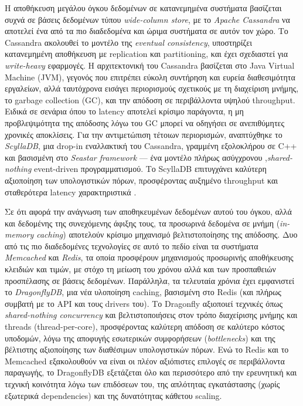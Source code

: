 Η αποθήκευση μεγάλου όγκου δεδομένων σε κατανεμημένα συστήματα βασίζεται συχνά σε βάσεις δεδομένων τύπου \textit{wide-column store}, με το \textit{Apache Cassandra} να αποτελεί ένα από τα πιο διαδεδομένα και ώριμα συστήματα σε αυτόν τον χώρο. Το Cassandra ακολουθεί το μοντέλο της \textit{eventual consistency}, υποστηρίζει κατανεμημένη αποθήκευση με replication και partitioning, και έχει σχεδιαστεί για \textit{write-heavy} εφαρμογές. Η αρχιτεκτονική του Cassandra βασίζεται στο Java Virtual Machine (JVM), γεγονός που επιτρέπει εύκολη συντήρηση και ευρεία διαθεσιμότητα εργαλείων, αλλά ταυτόχρονα εισάγει περιορισμούς σχετικούς με τη διαχείριση μνήμης, το garbage collection (GC), και την απόδοση σε περιβάλλοντα υψηλού throughput. Ειδικά σε σενάρια όπου το latency αποτελεί κρίσιμο παράγοντα, η μη προβλεψιμότητα της απόδοσης λόγω του GC μπορεί να οδηγήσει σε ανεπιθύμητες χρονικές αποκλίσεις. Για την αντιμετώπιση τέτοιων περιορισμών, αναπτύχθηκε το \textit{ScyllaDB}, μια drop-in εναλλακτική του Cassandra, γραμμένη εξολοκλήρου σε C++ και βασισμένη στο \textit{Seastar framework} — ένα μοντέλο πλήρως ασύγχρονου ,\textit{shared-nothing} event-driven προγραμματισμού. Το ScyllaDB επιτυγχάνει καλύτερη αξιοποίηση των υπολογιστικών πόρων, προσφέροντας αυξημένο throughput και σταθερότερα latency χαρακτηριστικά \cite{scyllainaction}.

Σε ότι αφορά την ανάγνωση των αποθηκευμένων δεδομένων αυτού του όγκου, αλλά και δεδομένης της συνεχόμενης άφιξης τους, τα προσωρινά δεδομένα σε μνήμη (\textit{in-memory caching}) αποτελούν κρίσιμο μηχανισμό βελτιστοποίησης της απόδοσης. Δυο από τις πιο διαδεδομένες τεχνολογίες σε αυτό το πεδίο είναι τα συστήματα \textit{Memcached} και \textit{Redis}, τα οποία προσφέρουν μηχανισμούς προσωρινής αποθήκευσης κλειδιών και τιμών, με στόχο τη μείωση του χρόνου αλλά και των προσπαθειών προσπέλασης σε βάσεις δεδομένων. Παράλληλα, τα τελευταία χρόνια έχει εμφανιστεί το \textit{DragonflyDB}, μια νέα υλοποίηση caching, βασισμένη στο Redis (και πλήρως συμβατή με το API και τους drivers του). Το Dragonfly αξιοποιεί τεχνικές όπως \textit{shared-nothing concurrency} και βελτιστοποιήσεις στον τρόπο διαχείρισης μνήμης και threads (thread-per-core), προσφέροντας καλύτερη απόδοση σε καλύτερο κόστος υποδομών, λόγω της αποφυγής εσωτερικών συμφορήσεων (\textit{bottlenecks}) και της βέλτιστης αξιοποίησης των διαθέσιμων υπολογιστικών πόρων. Ενώ το Redis και το Memcached εξακολουθούν να είναι οι πλέον αξιόπιστες επιλογές σε περιβάλλοντα παραγωγής, το DragonflyDB εξετάζεται όλο και περισσότερο από την ερευνητική και τεχνική κοινότητα λόγω των επιδόσεων του, της απλότητας εγκατάστασης (χωρίς εξωτερικά dependencies) και της δυνατότητας κάθετου scaling.

